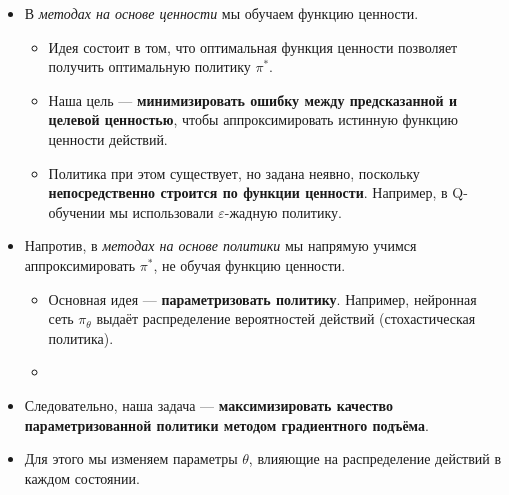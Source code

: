 \documentclass[11pt,a4paper]{article}
\begin{document}
\begin{itemize}
\tightlist
\item
  В \emph{методах на основе ценности} мы обучаем функцию ценности.

  \begin{itemize}
  \tightlist
  \item
    Идея состоит в том, что оптимальная функция ценности позволяет получить оптимальную политику \(\pi^{*}\).
  \item
    Наша цель --- \textbf{минимизировать ошибку между предсказанной и целевой ценностью}, чтобы аппроксимировать истинную функцию ценности действий.
  \item
    Политика при этом существует, но задана неявно, поскольку \textbf{непосредственно строится по функции ценности}. Например, в Q-обучении мы использовали \(\varepsilon\)-жадную политику.
  \end{itemize}
\item
  Напротив, в \emph{методах на основе политики} мы напрямую учимся аппроксимировать \(\pi^{*}\), не обучая функцию ценности.

  \begin{itemize}
  \tightlist
  \item
    Основная идея --- \textbf{параметризовать политику}. Например, нейронная сеть \(\pi_\theta\) выдаёт распределение вероятностей действий (стохастическая политика).
  \item
  \end{itemize}
\end{itemize}


\begin{itemize}
\tightlist
\item
  Следовательно, наша задача --- \textbf{максимизировать качество параметризованной политики методом градиентного подъёма}.
\item
  Для этого мы изменяем параметры \(\theta\), влияющие на распределение действий в каждом состоянии.
\end{itemize}

\end{document}
